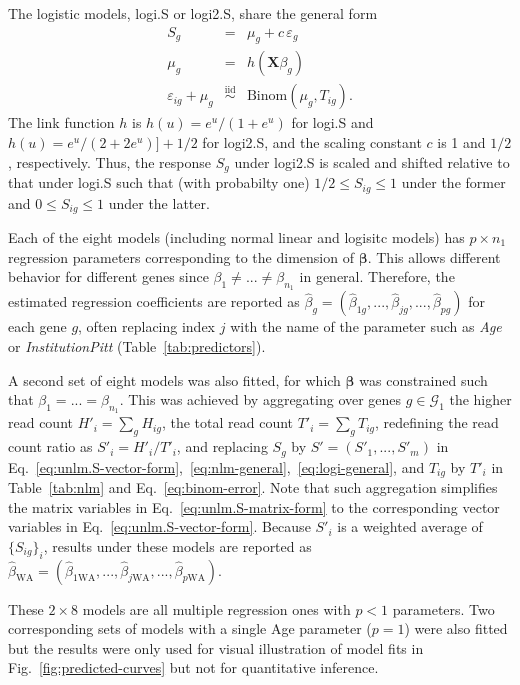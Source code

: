 \documentclass[12pt,letterpaper]{article}
\begin{document}
The logistic models, logi.S or logi2.S, share the general form
\begin{eqnarray}
S_g &=& \mu_g + c\, \varepsilon_g
\label{eq:logi-general}
\\
\mu_g &=& h(\mathbf{X} \beta_g)
\label{eq:glm-mean-predictor}
\\
\varepsilon_{ig} + \mu_g &\overset{\mathrm{iid}}{\sim}& \mathrm{Binom}(\mu_g, T_{ig}).
\label{eq:binom-error}
\end{eqnarray}
The link function \(h\) is \(h(u) = e^u / (1 + e^u)\) for logi.S and \(h(u) =
e^u / (2 + 2e^u)] + 1/2\) for logi2.S, and the scaling constant \(c\) is 1
 and \(1/2\), respectively.  Thus, the response \(S_g\) under logi2.S is scaled and shifted relative to
that under logi.S such that (with probabilty one) \(1/2\le S_{ig}\le 1\) under the former and
\(0\le S_{ig}\le 1\) under the latter.

Each of the eight models (including normal linear and logisitc models) has \(p\times n_1\) regression parameters corresponding to the
dimension of \(\boldsymbol{\beta}\).  This allows different behavior for
different genes since \(\beta_1\neq ...\neq\beta_{n_1}\) in general.
Therefore, the estimated regression coefficients are reported as \(\hat{\beta}_g =
(\hat{\beta}_{1g},...,\hat{\beta}_{jg},...,\hat{\beta}_{pg})\) for each gene \(g\), often
replacing index \(j\) with the name of the parameter such as \emph{Age} or
\emph{InstitutionPitt} (Table~\ref{tab:predictors}).

A second set of eight models was also
fitted, for which \(\boldsymbol{\beta}\) was constrained such that \(\beta_1 =
... = \beta_{n_1}\).  This was achieved by aggregating over genes
\(g\in\mathcal{G}_1\) the higher read count \(H'_i = \sum_g H_{ig}\), the
total read count \(T'_i = \sum_g T_{ig}\), redefining the read count ratio
as \(S'_i = H'_i / T'_i\), and replacing \(S_g\) by \(S'=(S'_1,...,S'_m)\) in
Eq.~\ref{eq:unlm.S-vector-form},~\ref{eq:nlm-general},~\ref{eq:logi-general}, and \(T_{ig}\) by \(T'_i\) in
Table~\ref{tab:nlm} and Eq.~\ref{eq:binom-error}.  Note that such aggregation
simplifies the matrix variables in Eq.~\ref{eq:unlm.S-matrix-form} to the
corresponding vector variables in Eq.~\ref{eq:unlm.S-vector-form}.  Because \(S'_i\) is a
weighted average of \(\{S_{ig}\}_i\), results under these models are reported
as \(\hat{\beta}_\mathrm{WA} =
(\hat{\beta}_{1\mathrm{WA}},...,\hat{\beta}_{j\mathrm{WA}},...,\hat{\beta}_{p\mathrm{WA}})\).

These \(2\times 8\) models are all multiple regression ones with \(p<1\)
parameters.  Two corresponding sets of models with a single Age parameter
(\(p=1\)) were also fitted but the results were only used for visual
illustration of model fits in Fig.~\ref{fig:predicted-curves} but not for
quantitative inference.
\end{document}
